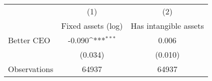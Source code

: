 {
\def\sym#1{\ifmmode^{#1}\else\(^{#1}\)\fi}
\begin{tabular}{l*{2}{c}}
\hline\hline
                    &\multicolumn{1}{c}{(1)}&\multicolumn{1}{c}{(2)}\\
                    &\multicolumn{1}{c}{Fixed assets (log)}&\multicolumn{1}{c}{Has intangible assets}\\
\hline
Better CEO          &      -0.090\sym{***}&       0.006         \\
                    &     (0.034)         &     (0.010)         \\
\hline
Observations        &       64937         &       64937         \\
\hline\hline
\end{tabular}
}
